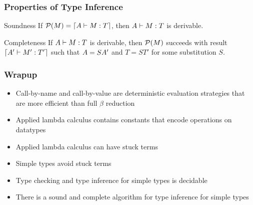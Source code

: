 \documentclass[pdftex,aspectratio=169]{beamer}
\begin{document}
\begin{frame}
  \frametitle{Properties of Type Inference}
  \begin{block}{Soundness}
    If $\mathcal{P} (M) = \lceil A \vdash M: T\rceil$, then $A \vdash M: T$ is derivable.
  \end{block}
  \begin{block}{Completeness}
    If $A \vdash M : T$ is derivable, then $\mathcal{P} (M)$ succeeds with result $\lceil A' \vdash M': T'\rceil$ such that $A = SA'$ and $T = S T'$ for some substitution $S$. 
  \end{block}
\end{frame}

\begin{frame}
  \frametitle{Wrapup}
  \begin{itemize}
  \item Call-by-name and call-by-value are deterministic evaluation strategies that are more efficient than full $\beta$ reduction
  \item Applied lambda calculus contains constants that encode operations on datatypes
  \item Applied lambda calculus can have stuck terms
  \item Simple types avoid stuck terms
  \item Type checking and type inference for simple types is decidable
  \item There is a sound and complete algorithm for type inference for simple types
  \end{itemize}
\end{frame}
\end{document}
